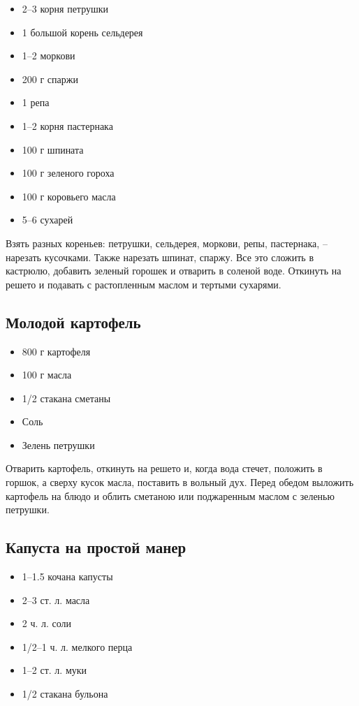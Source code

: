 \begin{itemize}
	\item 2–3 корня петрушки 
    \item 1 большой корень сельдерея 
    \item 1–2 моркови 
    \item 200 г спаржи 
    \item 1 репа
    \item 1–2 корня пастернака 
    \item 100 г шпината 
    \item 100 г зеленого гороха 
    \item 100 г коровьего масла
    \item 5–6 сухарей
\end{itemize}

Взять разных кореньев: петрушки, сельдерея, моркови, репы, пастернака, – нарезать кусочками. Также нарезать шпинат, спаржу. Все это сложить в кастрюлю, добавить зеленый горошек и отварить в соленой воде. Откинуть на решето и подавать с растопленным маслом и тертыми сухарями.

\subsection{Молодой картофель}

\begin{itemize}
	\item 800 г картофеля 
    \item 100 г масла 
    \item 1/2 стакана сметаны 
    \item Соль 
    \item Зелень петрушки
\end{itemize}

Отварить картофель, откинуть на решето и, когда вода стечет, положить в горшок, а сверху кусок масла, поставить в вольный дух. Перед обедом выложить картофель на блюдо и облить сметаною или поджаренным маслом с зеленью петрушки.

\subsection{Капуста на простой манер}

\begin{itemize}
	\item 1–1.5 кочана капусты 
    \item 2–3 ст. л. масла 
    \item 2 ч. л. соли 
    \item 1/2–1 ч. л. мелкого перца 
    \item 1–2 ст. л. муки 
    \item 1/2 стакана бульона
\end{itemize}

